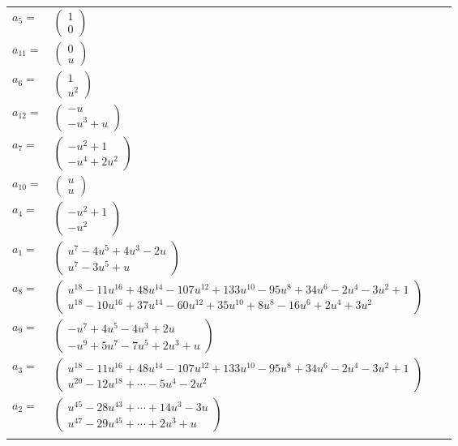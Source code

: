 \documentclass[1p]{elsarticle_modified}
\theoremstyle{definition}
\begin{document}
\begin{tabular}{m{7pt} m{180pt} m{7pt} m{180pt} }
\flushright $a_{5}=$&$\begin{pmatrix}1\\0\end{pmatrix}$ \\
\flushright $a_{11}=$&$\begin{pmatrix}0\\u\end{pmatrix}$ \\
\flushright $a_{6}=$&$\begin{pmatrix}1\\u^2\end{pmatrix}$ \\
\flushright $a_{12}=$&$\begin{pmatrix}- u\\- u^3+u\end{pmatrix}$ \\
\flushright $a_{7}=$&$\begin{pmatrix}- u^2+1\\- u^4+2 u^2\end{pmatrix}$ \\
\flushright $a_{10}=$&$\begin{pmatrix}u\\u\end{pmatrix}$ \\
\flushright $a_{4}=$&$\begin{pmatrix}- u^2+1\\- u^2\end{pmatrix}$ \\
\flushright $a_{1}=$&$\begin{pmatrix}u^7-4 u^5+4 u^3-2 u\\u^7-3 u^5+u\end{pmatrix}$ \\
\flushright $a_{8}=$&$\begin{pmatrix}u^{18}-11 u^{16}+48 u^{14}-107 u^{12}+133 u^{10}-95 u^8+34 u^6-2 u^4-3 u^2+1\\u^{18}-10 u^{16}+37 u^{14}-60 u^{12}+35 u^{10}+8 u^8-16 u^6+2 u^4+3 u^2\end{pmatrix}$ \\
\flushright $a_{9}=$&$\begin{pmatrix}- u^7+4 u^5-4 u^3+2 u\\- u^9+5 u^7-7 u^5+2 u^3+u\end{pmatrix}$ \\
\flushright $a_{3}=$&$\begin{pmatrix}u^{18}-11 u^{16}+48 u^{14}-107 u^{12}+133 u^{10}-95 u^8+34 u^6-2 u^4-3 u^2+1\\u^{20}-12 u^{18}+\cdots-5 u^4-2 u^2\end{pmatrix}$ \\
\flushright $a_{2}=$&$\begin{pmatrix}u^{45}-28 u^{43}+\cdots+14 u^3-3 u\\u^{47}-29 u^{45}+\cdots+2 u^3+u\end{pmatrix}$\\&\end{tabular}
\end{document}
